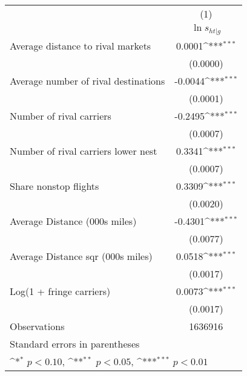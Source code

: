 {
\def\sym#1{\ifmmode^{#1}\else\(^{#1}\)\fi}
\begin{tabular}{l*{1}{c}}
\toprule
                    &\multicolumn{1}{c}{(1)}\\
                    &\multicolumn{1}{c}{$\ln s_{ht|g}$}\\
\midrule
Average distance to rival markets&      0.0001\sym{***}\\
                    &    (0.0000)         \\
\addlinespace
Average number of rival destinations&     -0.0044\sym{***}\\
                    &    (0.0001)         \\
\addlinespace
Number of rival carriers&     -0.2495\sym{***}\\
                    &    (0.0007)         \\
\addlinespace
Number of rival carriers lower nest&      0.3341\sym{***}\\
                    &    (0.0007)         \\
\addlinespace
Share nonstop flights &      0.3309\sym{***}\\
                    &    (0.0020)         \\
\addlinespace
Average Distance (000s miles)&     -0.4301\sym{***}\\
                    &    (0.0077)         \\
\addlinespace
Average Distance sqr (000s miles)&      0.0518\sym{***}\\
                    &    (0.0017)         \\
\addlinespace
Log(1 + fringe carriers)&      0.0073\sym{***}\\
                    &    (0.0017)         \\
\midrule
Observations        &     1636916         \\
\bottomrule
\multicolumn{2}{l}{\footnotesize Standard errors in parentheses}\\
\multicolumn{2}{l}{\footnotesize \sym{*} \(p<0.10\), \sym{**} \(p<0.05\), \sym{***} \(p<0.01\)}\\
\end{tabular}
}
